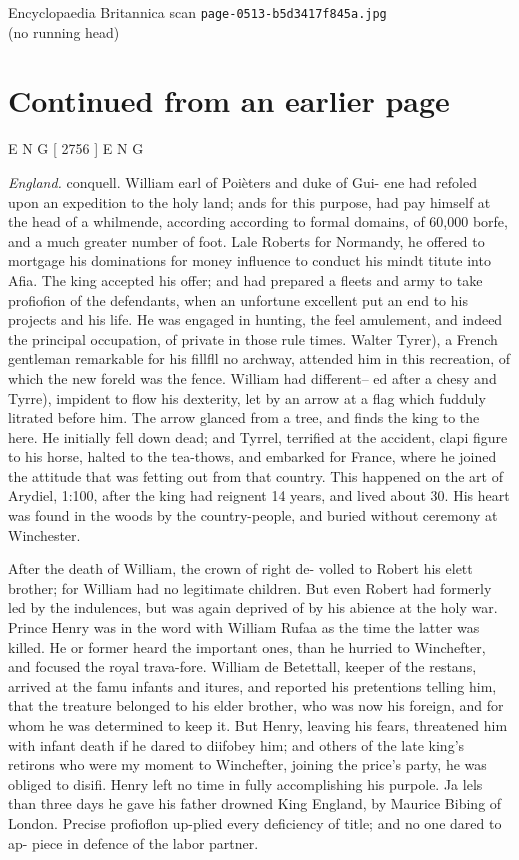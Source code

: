 \documentclass{article}
\begin{document}
\begin{center}
{\Large Encyclopaedia Britannica scan \texttt{page-0513-b5d3417f845a.jpg}}\\[0.5em]
(no running head)
\end{center}
\section*{Continued from an earlier page}
E N G [ 2756 ] E N G

\textit{England.}
conquell. William earl of Poièters and duke of Gui- ene had refoled upon an expedition to the holy land; ands for this purpose, had pay himself at the head of a whilmende, according according to formal domains, of 60,000 borfe, and a much greater number of foot. Lale Roberts for Normandy, he offered to mortgage his dominations for money influence to conduct his mindt titute into Afia. The king accepted his offer; and had prepared a fleets and army to take profiofion of the defendants, when an unfortune excellent put an end to his projects and his life. He was engaged in hunting, the feel amulement, and indeed the principal occupation, of private in those rule times. Walter Tyrer), a French gentleman remarkable for his fillfll no archway, attended him in this recreation, of which the new foreld was the fence. William had different– ed after a chesy and Tyrre), impident to flow his dexterity, let by an arrow at a flag which fudduly litrated before him. The arrow glanced from a tree, and finds the king to the here. He initially fell down dead; and Tyrrel, terrified at the accident, clapi figure to his horse, halted to the tea-thows, and embarked for France, where he joined the attitude that was fetting out from that country. This happened on the art of Arydiel, 1:100, after the king had reignent 14 years, and lived about 30. His heart was found in the woods by the country-people, and buried without ceremony at Winchester.

After the death of William, the crown of right de- volled to Robert his elett brother; for William had no legitimate children. But even Robert had formerly led by the indulences, but was again deprived of by his abience at the holy war. Prince Henry was in the word with William Rufaa as the time the latter was killed. He or former heard the important ones, than he hurried to Winchefter, and focused the royal trava-fore. William de Betettall, keeper of the restans, arrived at the famu infants and itures, and reported his pretentions telling him, that the treature belonged to his elder brother, who was now his foreign, and for whom he was determined to keep it. But Henry, leaving his fears, threatened him with infant death if he dared to diifobey him; and others of the late king’s retirons who were my moment to Winchefter, joining the price’s party, he was obliged to disifi. Henry left no time in fully accomplishing his purpole. Ja lels than three days he gave his father drowned King England, by Maurice Bibing of London. Precise profioflon up-plied every deficiency of title; and no one dared to ap- piece in defence of the labor partner.
\end{document}
